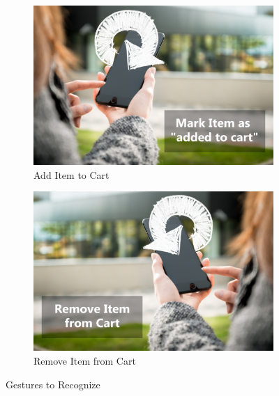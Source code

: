 \begin{figure}[h]
\captionsetup{justification=centering}
\begin{subfigure}{0.475\textwidth}
\includegraphics[width=\textwidth]{res/gestures/addToCart.png}
\caption{Add Item to Cart}
\label{fig:gestureAdd}
\end{subfigure} \hspace{0.05\textwidth}
\begin{subfigure}{0.475\textwidth}
\includegraphics[width=\textwidth]{res/gestures/removeFromCart.png}
\caption{Remove Item from Cart}
\label{fig:gestureRemove}
\end{subfigure}
\caption{Gestures to Recognize}
\label{fig:gesturesToRecognize}
\end{figure}
